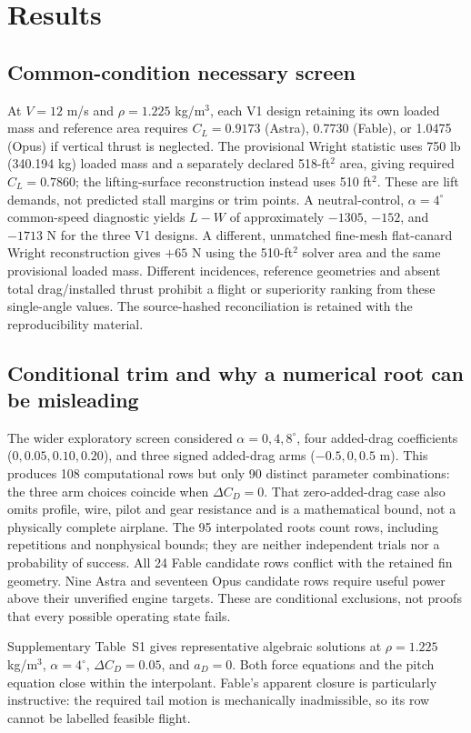 \documentclass[10pt,letterpaper]{article}
\begin{document}
\section{Results}
\subsection{Common-condition necessary screen}
At $V=12$ m/s and $\rho=1.225$ kg/m$^3$, each V1 design retaining its own loaded mass and reference area requires $C_L=0.9173$ (Astra), 0.7730 (Fable), or 1.0475 (Opus) if vertical thrust is neglected. The provisional Wright statistic uses 750 lb (340.194 kg) loaded mass and a separately declared 518-ft$^2$ area, giving required $C_L=0.7860$; the lifting-surface reconstruction instead uses 510 ft$^2$. These are lift demands, not predicted stall margins or trim points. A neutral-control, $\alpha=4^\circ$ common-speed diagnostic yields $L-W$ of approximately $-1305$, $-152$, and $-1713$ N for the three V1 designs. A different, unmatched fine-mesh flat-canard Wright reconstruction gives $+65$ N using the 510-ft$^2$ solver area and the same provisional loaded mass. Different incidences, reference geometries and absent total drag/installed thrust prohibit a flight or superiority ranking from these single-angle values. The source-hashed reconciliation is retained with the reproducibility material.

\subsection{Conditional trim and why a numerical root can be misleading}
The wider exploratory screen considered $\alpha=0,4,8^\circ$, four added-drag coefficients ($0,0.05,0.10,0.20$), and three signed added-drag arms ($-0.5,0,0.5$ m). This produces 108 computational rows but only 90 distinct parameter combinations: the three arm choices coincide when $\Delta C_D=0$. That zero-added-drag case also omits profile, wire, pilot and gear resistance and is a mathematical bound, not a physically complete airplane. The 95 interpolated roots count rows, including repetitions and nonphysical bounds; they are neither independent trials nor a probability of success. All 24 Fable candidate rows conflict with the retained fin geometry. Nine Astra and seventeen Opus candidate rows require useful power above their unverified engine targets. These are conditional exclusions, not proofs that every possible operating state fails.

Supplementary Table~S1 gives representative algebraic solutions at $\rho=1.225$ kg/m$^3$, $\alpha=4^\circ$, $\Delta C_D=0.05$, and $a_D=0$. Both force equations and the pitch equation close within the interpolant. Fable's apparent closure is particularly instructive: the required tail motion is mechanically inadmissible, so its row cannot be labelled feasible flight.
\end{document}
